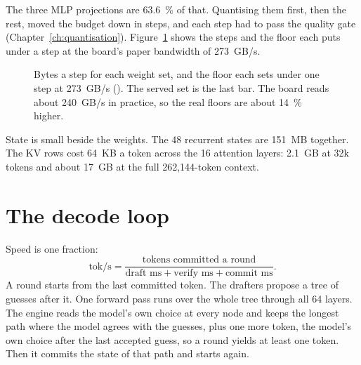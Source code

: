 The three MLP projections are 63.6~\% of that. Quantising them first, then the rest, moved the budget down in steps, and each step had to pass the quality gate (Chapter~\ref{ch:quantisation}). Figure~\ref{fig:byte-budget} shows the steps and the floor each puts under a step at the board's paper bandwidth of 273~GB/s.

\begin{figure}[htbp]
\centering
{}
\caption[Bytes a step and the floor they set]{Bytes a step for each weight set, and the floor each sets under one step at 273~GB/s (\arith). The served set is the last bar. The board reads about 240~GB/s in practice, so the real floors are about 14~\% higher.}\label{fig:byte-budget}
\end{figure}

State is small beside the weights. The 48 recurrent states are 151~MB together. The KV rows cost 64~KB a token across the 16 attention layers: 2.1~GB at 32k tokens and about 17~GB at the full 262,144-token context.

\section{The decode loop}

Speed is one fraction:
\[
\text{tok/s} = \frac{\text{tokens committed a round}}{\text{draft ms} + \text{verify ms} + \text{commit ms}}.
\]
A round starts from the last committed token. The drafters propose a tree of guesses after it. One forward pass runs over the whole tree through all 64 layers. The engine reads the model's own choice at every node and keeps the longest path where the model agrees with the guesses, plus one more token, the model's own choice after the last accepted guess, so a round yields at least one token. Then it commits the state of that path and starts again.

